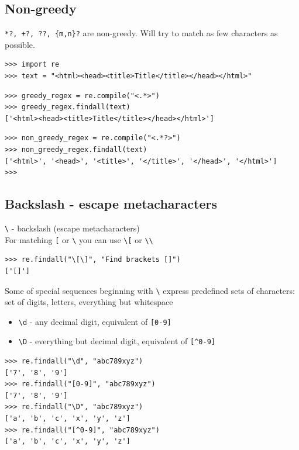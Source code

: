 \documentclass{beamer}
\begin{document}
\subsection{Non-greedy}
\begin{frame}[fragile]
\verb/*?, +?, ??, {m,n}?/ are non-greedy. Will try to match as few characters as possible.
\pause

\begin{lstlisting}
>>> import re
>>> text = "<html><head><title>Title</title></head></html>"
\end{lstlisting}
\pause
\begin{lstlisting}
>>> greedy_regex = re.compile("<.*>")
>>> greedy_regex.findall(text)
['<html><head><title>Title</title></head></html>']
\end{lstlisting}
\pause
\begin{lstlisting}
>>> non_greedy_regex = re.compile("<.*?>")
>>> non_greedy_regex.findall(text)
['<html>', '<head>', '<title>', '</title>', '</head>', '</html>']
>>>
\end{lstlisting}

\end{frame}

\subsection{Backslash - escape metacharacters}
\begin{frame}[fragile]
\verb/\/ - backslash (escape metacharacters) \\
For matching \verb/[/ or \verb/\/ you can use \verb/\[/ or \verb/\\/ \\
\begin{lstlisting}
>>> re.findall("\[\]", "Find brackets []")
['[]']
\end{lstlisting}
\pause
Some of special sequences beginning with \verb/\/ express predefined sets of characters: set of digits, letters, everything but whitespace
\end{frame}

\begin{frame}[fragile]
\begin{itemize}
\item \verb/\d/ - any decimal digit, equivalent of \verb/[0-9]/
\item \verb/\D/ - everything but decimal digit, equivalent of \verb/[^0-9]/
\end{itemize}
\begin{lstlisting}
>>> re.findall("\d", "abc789xyz")
['7', '8', '9']
>>> re.findall("[0-9]", "abc789xyz")
['7', '8', '9']
>>> re.findall("\D", "abc789xyz")
['a', 'b', 'c', 'x', 'y', 'z']
>>> re.findall("[^0-9]", "abc789xyz")
['a', 'b', 'c', 'x', 'y', 'z']
\end{lstlisting}
\end{frame}
\end{document}
